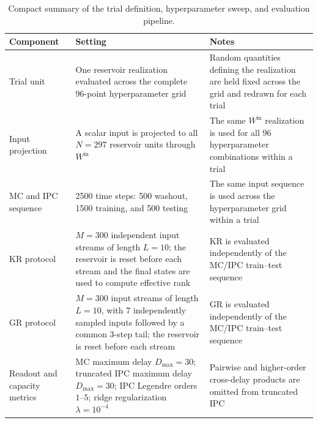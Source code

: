 \documentclass[a4paper,fleqn]{style_neural_networks/cas-dc}
\begin{document}
\begin{table}[!t]
    \centering
    \scriptsize
    \caption{Compact summary of the trial definition, hyperparameter sweep, and evaluation pipeline.}
    \label{tab:exp_setup}
    \renewcommand{\arraystretch}{1.15}
    \setlength{\tabcolsep}{4pt}
    \begin{tabular}{p{}p{}p{}}
        \toprule
        Component & Setting & Notes \\
        \midrule

        Trial unit
        & One reservoir realization evaluated across the complete 96-point hyperparameter grid
        & Random quantities defining the realization are held fixed across the grid and redrawn for each trial \\
        
        \addlinespace
        Input projection
        & A scalar input is projected to all \(N=297\) reservoir units through \(W^{\mathrm{in}}\)
        & The same \(W^{\mathrm{in}}\) realization is used for all 96 hyperparameter combinations within a trial \\
        
        \addlinespace
        MC and IPC sequence
        & 2500 time steps: 500 washout, 1500 training, and 500 testing
        & The same input sequence is used across the hyperparameter grid within a trial \\
        
        \addlinespace
        KR protocol
        & \(M=300\) independent input streams of length \(L=10\); the reservoir is reset before each stream and the final states are used to compute effective rank
        & KR is evaluated independently of the MC/IPC train--test sequence \\
        
        \addlinespace
        GR protocol
        & \(M=300\) input streams of length \(L=10\), with 7 independently sampled inputs followed by a common 3-step tail; the reservoir is reset before each stream
        & GR is evaluated independently of the MC/IPC train--test sequence \\
        
        \addlinespace
        Readout and capacity metrics
        & MC maximum delay \(D_{\max}=30\); truncated IPC maximum delay \(D_{\max}=30\); IPC Legendre orders \(1\)--\(5\); ridge regularization \(\lambda=10^{-4}\)
        & Pairwise and higher-order cross-delay products are omitted from truncated IPC \\
        

\end{tabular}
\end{table}
\end{document}

